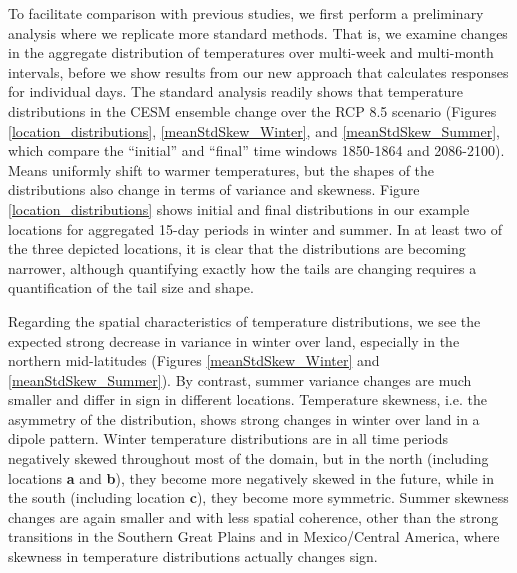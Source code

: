 \documentclass{ametsoc}
\begin{document}
To facilitate comparison with previous studies, we first perform a preliminary analysis where we replicate more standard methods. That is, we examine changes in the aggregate distribution of temperatures over multi-week and multi-month intervals, before we show results from our new approach that calculates responses for individual days. The standard analysis readily shows that temperature distributions in the CESM ensemble change over the RCP 8.5 scenario (Figures \ref{location_distributions}, \ref{meanStdSkew_Winter}, and \ref{meanStdSkew_Summer}, which compare the “initial” and “final” time windows 1850-1864 and 2086-2100). Means uniformly shift to warmer temperatures, but the shapes of the distributions also change in terms of variance and skewness. Figure \ref{location_distributions} shows initial and final distributions in our example locations for aggregated 15-day periods in winter and summer. In at least two of the three depicted locations, it is clear that the distributions are becoming narrower, although quantifying exactly how the tails are changing requires a quantification of the tail size and shape.

Regarding the spatial characteristics of temperature distributions, we see the expected strong decrease in variance in winter over land, especially in the northern mid-latitudes (Figures \ref{meanStdSkew_Winter} and \ref{meanStdSkew_Summer}). By contrast, summer variance changes are much smaller and differ in sign in different locations. Temperature skewness, i.e. the asymmetry of the distribution, shows strong changes in winter over land in a dipole pattern. Winter temperature distributions are in all time periods negatively skewed throughout most of the domain, but in the north (including locations \textbf{a} and \textbf{b}), they become more negatively skewed in the future, while in the south (including location \textbf{c}), they become more symmetric. Summer skewness changes are again smaller and with less spatial coherence, other than the strong transitions in the Southern Great Plains and in Mexico/Central America, where 
skewness in temperature distributions actually changes sign. 
 

\end{document}
